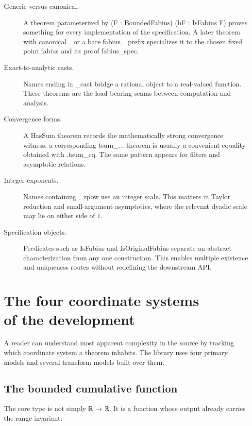 \documentclass[11pt,a4paper,openany]{book}
\def\decl#1{#1}
\def\code#1{#1}
\newcommand{\decl}[1]{\texttt{\detokenize{#1}}}
\newcommand{\code}[1]{\texttt{\detokenize{#1}}}
\begin{document}
\begin{description}
\item[Generic versus canonical.]
A theorem parameterized by \code{(F : BoundedFabius) (hF : IsFabius F)} proves
something for every implementation of the specification.  A later theorem
with \code{canonical_} or a bare \code{fabius_} prefix specializes it to the
chosen fixed point \decl{fabius} and its proof \decl{fabius_spec}.

\item[Exact-to-analytic casts.]
Names ending in \code{_cast} bridge a rational object to a real-valued
function.  These theorems are the load-bearing seams between computation and
analysis.

\item[Convergence forms.]
A \code{HasSum} theorem records the mathematically strong convergence witness;
a corresponding \code{tsum_...} theorem is usually a convenient equality
obtained with \code{.tsum_eq}.  The same pattern appears for filters and
asymptotic relations.

\item[Integer exponents.]
Names containing \code{_zpow} use an integer scale.  This matters in Taylor
reduction and small-argument asymptotics, where the relevant dyadic scale may
lie on either side of $1$.

\item[Specification objects.]
Predicates such as \decl{IsFabius} and \decl{IsOriginalFabius} separate an
abstract characterization from any one construction.  This enables multiple
existence and uniqueness routes without redefining the downstream API.
\end{description}

\chapter[The four coordinate systems of the development]{The four coordinate systems\\of the development}
\label{ch:coordinates}

A reader can understand most apparent complexity in the source by tracking
which coordinate system a theorem inhabits.  The library uses four primary
models and several transform models built over them.

\section{The bounded cumulative function}
The core type is not simply \code{ℝ → ℝ}.  It is a function whose output
already carries the range invariant:
\end{document}

